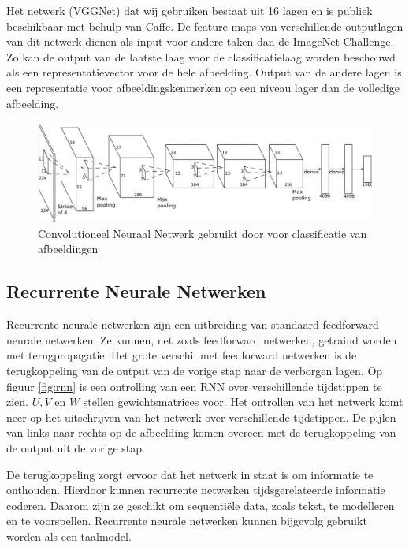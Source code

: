 Het netwerk (VGGNet)\cite{Arge2015} dat wij gebruiken bestaat uit 16 lagen en is publiek beschikbaar met behulp van Caffe\cite{Jia2014}. De feature maps van verschillende outputlagen van dit netwerk dienen als input voor andere taken dan de ImageNet Challenge. Zo kan de output van de laatste laag voor de classificatielaag worden beschouwd als een representatievector voor de hele afbeelding. Output van de andere lagen is een representatie voor afbeeldingskenmerken op een niveau lager dan de volledige afbeelding.
\begin{figure}[tb]
	\centering
	\includegraphics[width=\linewidth]{Images/cnn.PNG}
	\caption{Convolutioneel Neuraal Netwerk gebruikt door \cite{Krizhevsky2012a} voor classificatie van afbeeldingen}
	\label{fig:AlexNet}
\end{figure}

\subsection{Recurrente Neurale Netwerken}
Recurrente neurale netwerken zijn een uitbreiding van standaard feedforward neurale netwerken. Ze kunnen, net zoals feedforward netwerken, getraind worden met terugpropagatie. Het grote verschil met feedforward netwerken is de terugkoppeling van de output van de vorige stap naar de verborgen lagen. Op figuur \ref{fig:rnn} is een ontrolling van een RNN over verschillende tijdstippen te zien. $U,V$ en $W$ stellen gewichtsmatrices voor. Het ontrollen van het netwerk komt neer op het uitschrijven van het netwerk over verschillende tijdstippen. De pijlen van links naar rechts op de afbeelding komen overeen met de terugkoppeling van de output uit de vorige stap.

De terugkoppeling zorgt ervoor dat het netwerk in staat is om informatie te onthouden. Hierdoor kunnen recurrente netwerken tijdsgerelateerde informatie coderen. Daarom zijn ze geschikt om sequenti\"ele data, zoals tekst, te modelleren en te voorspellen. Recurrente neurale netwerken kunnen bijgevolg gebruikt worden als een taalmodel.

